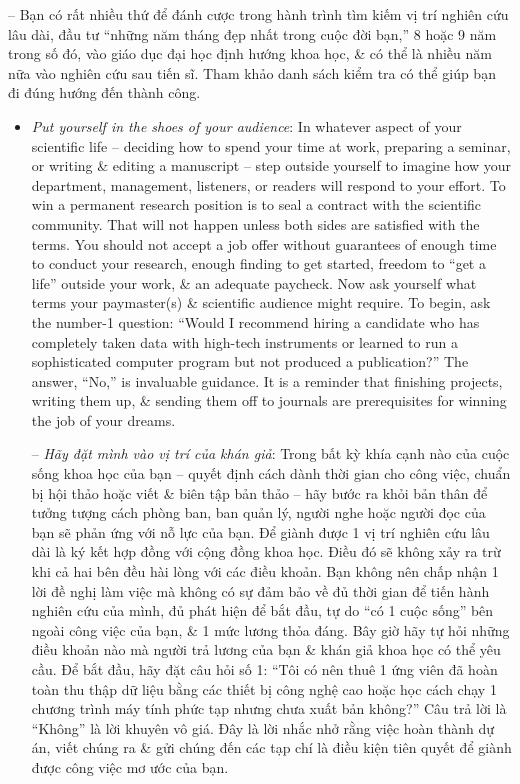 \documentclass{article}
\begin{document}
\begin{enumerate}
\begin{itemize}
		-- Bạn có rất nhiều thứ để đánh cược trong hành trình tìm kiếm vị trí nghiên cứu lâu dài, đầu tư ``những năm tháng đẹp nhất trong cuộc đời bạn,'' 8 hoặc 9 năm trong số đó, vào giáo dục đại học định hướng khoa học, \& có thể là nhiều năm nữa vào nghiên cứu sau tiến sĩ. Tham khảo danh sách kiểm tra có thể giúp bạn đi đúng hướng đến thành công.
		\begin{itemize}
			\item {\it Put yourself in the shoes of your audience}: In whatever aspect of your scientific life -- deciding how to spend your time at work, preparing a seminar, or writing \& editing a manuscript -- step outside yourself to imagine how your department, management, listeners, or readers will respond to your effort. To win a permanent research position is to seal a contract with the scientific community. That will not happen unless both sides are satisfied with the terms. You should not accept a job offer without guarantees of enough time to conduct your research, enough finding to get started, freedom to ``get a life'' outside your work, \& an adequate paycheck. Now ask yourself what terms your paymaster(s) \& scientific audience might require. To begin, ask the number-1 question: ``Would I recommend hiring a candidate who has completely taken data with high-tech instruments or learned to run a sophisticated computer program but not produced a publication?'' The answer, ``No,'' is invaluable guidance. It is a reminder that finishing projects, writing them up, \& sending them off to journals are prerequisites for winning the job of your dreams.

			-- {\it Hãy đặt mình vào vị trí của khán giả}: Trong bất kỳ khía cạnh nào của cuộc sống khoa học của bạn -- quyết định cách dành thời gian cho công việc, chuẩn bị hội thảo hoặc viết \& biên tập bản thảo -- hãy bước ra khỏi bản thân để tưởng tượng cách phòng ban, ban quản lý, người nghe hoặc người đọc của bạn sẽ phản ứng với nỗ lực của bạn. Để giành được 1 vị trí nghiên cứu lâu dài là ký kết hợp đồng với cộng đồng khoa học. Điều đó sẽ không xảy ra trừ khi cả hai bên đều hài lòng với các điều khoản. Bạn không nên chấp nhận 1 lời đề nghị làm việc mà không có sự đảm bảo về đủ thời gian để tiến hành nghiên cứu của mình, đủ phát hiện để bắt đầu, tự do ``có 1 cuộc sống'' bên ngoài công việc của bạn, \& 1 mức lương thỏa đáng. Bây giờ hãy tự hỏi những điều khoản nào mà người trả lương của bạn \& khán giả khoa học có thể yêu cầu. Để bắt đầu, hãy đặt câu hỏi số 1: ``Tôi có nên thuê 1 ứng viên đã hoàn toàn thu thập dữ liệu bằng các thiết bị công nghệ cao hoặc học cách chạy 1 chương trình máy tính phức tạp nhưng chưa xuất bản không?'' Câu trả lời là ``Không'' là lời khuyên vô giá. Đây là lời nhắc nhở rằng việc hoàn thành dự án, viết chúng ra \& gửi chúng đến các tạp chí là điều kiện tiên quyết để giành được công việc mơ ước của bạn.


\end{itemize}
\end{itemize}
\end{enumerate}
\end{document}
